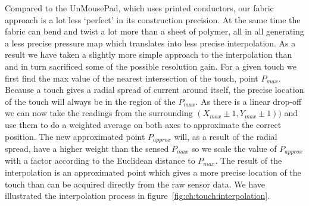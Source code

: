 Compared to the UnMousePad, which uses printed conductors, our fabric approach is a lot less `perfect' in its construction precision.
At the same time the fabric can bend and twist a lot more than a sheet of polymer, all in all generating a less precise pressure map which translates into less precise interpolation.
As a result we have taken a slightly more simple approach to the interpolation than \citet{rosenberg2009unmousepad} and in turn sacrificed some of the possible resolution gain.
\blank
For a given touch we first find the max value of the nearest intersection of the touch, point \(P_{max}\).
Because a touch gives a radial spread of current around itself, the precise location of the touch will always be in the region of the \(P_{max}\).
As there is a linear drop-off we can now take the readings from the surrounding \((X_{max}\pm1,Y_{max}\pm1))\) and use them to do a weighted average on both axes to approximate the correct position.
The new approximated point \(P_{approx}\) will, as a result of the radial spread, have a higher weight than the sensed \(P_{max}\) so we scale the value of \(P_{approx}\) with a factor according to the Euclidean distance to \(P_{max}\). 
The result of the interpolation is an approximated point which gives a more precise location of the touch than can be acquired directly from the raw sensor data.
We have illustrated the interpolation process in figure~\ref{fig:ch:touch:interpolation}.

